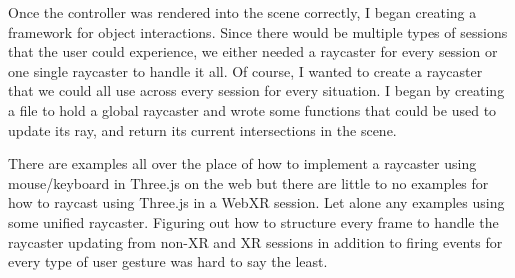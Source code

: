 \documentclass[onecolumn, draftclsnofoot,10pt, compsoc]{IEEEtran}
\begin{document}
    Once the controller was rendered into the scene correctly, I began creating a framework for object interactions. Since there would be multiple types of sessions that the user could experience, we either needed a raycaster for every session or one single raycaster to handle it all. Of course, I wanted to create a raycaster that we could all use across every session for every situation. I began by creating a file to hold a global raycaster and wrote some functions that could be used to update its ray, and return its current intersections in the scene.
    
    There are examples all over the place of how to implement a raycaster using mouse/keyboard in Three.js on the web but there are little to no examples for how to raycast using Three.js in a WebXR session. Let alone any examples using some unified raycaster. Figuring out how to structure every frame to handle the raycaster updating from non-XR and XR sessions in addition to firing events for every type of user gesture was hard to say the least.
    
\end{document}
